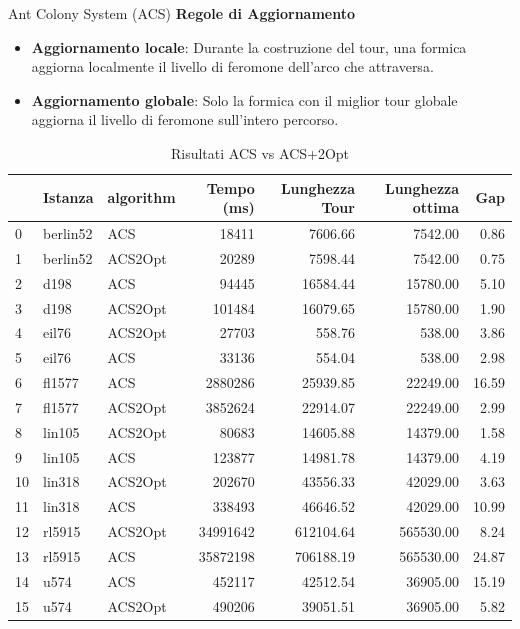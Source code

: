\documentclass{beamer}
\begin{document}
\begin{frame}{Ant Colony System (ACS)}
    \textbf{Regole di Aggiornamento}
    \begin{itemize}
        \item \textbf{Aggiornamento locale}: Durante la costruzione del tour, una formica aggiorna localmente il livello di feromone dell’arco che attraversa.
        \item \textbf{Aggiornamento globale}: Solo la formica con il miglior tour globale aggiorna il livello di feromone sull’intero percorso.
    \end{itemize}
    \begin{table}[H]
        \centering
        \caption{Risultati ACS vs ACS+2Opt}
        \begin{tabular}{lllrrrr}
            \toprule
               & Istanza  & algorithm & Tempo (ms) & Lunghezza Tour & Lunghezza ottima & Gap   \\
            \midrule
            0  & berlin52 & ACS       & 18411      & 7606.66        & 7542.00          & 0.86  \\
            1  & berlin52 & ACS2Opt   & 20289      & 7598.44        & 7542.00          & 0.75  \\
            2  & d198     & ACS       & 94445      & 16584.44       & 15780.00         & 5.10  \\
            3  & d198     & ACS2Opt   & 101484     & 16079.65       & 15780.00         & 1.90  \\
            4  & eil76    & ACS2Opt   & 27703      & 558.76         & 538.00           & 3.86  \\
            5  & eil76    & ACS       & 33136      & 554.04         & 538.00           & 2.98  \\
            6  & fl1577   & ACS       & 2880286    & 25939.85       & 22249.00         & 16.59 \\
            7  & fl1577   & ACS2Opt   & 3852624    & 22914.07       & 22249.00         & 2.99  \\
            8  & lin105   & ACS2Opt   & 80683      & 14605.88       & 14379.00         & 1.58  \\
            9  & lin105   & ACS       & 123877     & 14981.78       & 14379.00         & 4.19  \\
            10 & lin318   & ACS2Opt   & 202670     & 43556.33       & 42029.00         & 3.63  \\
            11 & lin318   & ACS       & 338493     & 46646.52       & 42029.00         & 10.99 \\
            12 & rl5915   & ACS2Opt   & 34991642   & 612104.64      & 565530.00        & 8.24  \\
            13 & rl5915   & ACS       & 35872198   & 706188.19      & 565530.00        & 24.87 \\
            14 & u574     & ACS       & 452117     & 42512.54       & 36905.00         & 15.19 \\
            15 & u574     & ACS2Opt   & 490206     & 39051.51       & 36905.00         & 5.82  \\
            \bottomrule
        \end{tabular}
    \end{table}



\end{frame}
\end{document}
